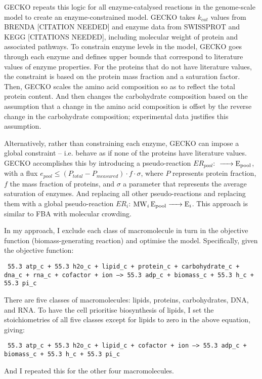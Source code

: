 GECKO repeats this logic for all enzyme-catalysed reactions in the genome-scale model to create an enzyme-constrained model.
GECKO takes $k_{cat}$ values from BRENDA [CITATION NEEDED] and enzyme data from SWISSPROT and KEGG [CITATIONS NEEDED], including molecular weight of protein and associated pathways.
To constrain enzyme levels in the model, GECKO goes through each enzyme and defines upper bounds that correspond to literature values of enzyme properties.
For the proteins that do not have literature values, the constraint is based on the protein mass fraction and a saturation factor.
Then, GECKO scales the amino acid composition so as to reflect the total protein content.
And then changes the carbohydrate composition based on the assumption that a change in the amino acid composition is offset by the reverse change in the carbohydrate composition;
experimental data justifies this assumption.

Alternatively, rather than constraining each enzyme, GECKO can impose a global constraint -- i.e. behave as if none of the proteins have literature values.
GECKO accomplishes this by introducing a pseudo-reaction $ER_{pool}$: $\ce{ -> E_{pool} }$, with a flux $e_{pool} \le (P_{total} - P_{measured}) \cdot f \cdot \sigma$, where $P$ represents protein fraction, $f$ the mass fraction of proteins, and $\sigma$ a parameter that represents the average saturation of enzymes.
And replacing all other pseudo-reactions and replacing them with a global pseudo-reaction $ER_{i}$: $\ce{ MW_{i} E_{pool} -> E_{i} }$.
This approach is similar to FBA with molecular crowding.

In my approach, I exclude each class of macromolecule in turn in the objective function (biomass-generating reaction) and optimise the model.
Specifically, given the objective function:

\texttt{
  55.3 atp_c + 55.3 h2o_c + lipid_c + protein_c + carbohydrate_c + dna_c + rna_c + cofactor + ion --> 55.3 adp_c + biomass_c + 55.3 h_c + 55.3 pi_c
}

There are five classes of macromolecules: lipids, proteins, carbohydrates, DNA, and RNA.
To have the cell prioritise biosynthesis of lipids, I set the stoichiometries of all five classes except for lipids to zero in the above equation, giving:

\texttt{
  55.3 atp_c + 55.3 h2o_c + lipid_c + cofactor + ion --> 55.3 adp_c + biomass_c + 55.3 h_c + 55.3 pi_c
}

And I repeated this for the other four macromolecules.

